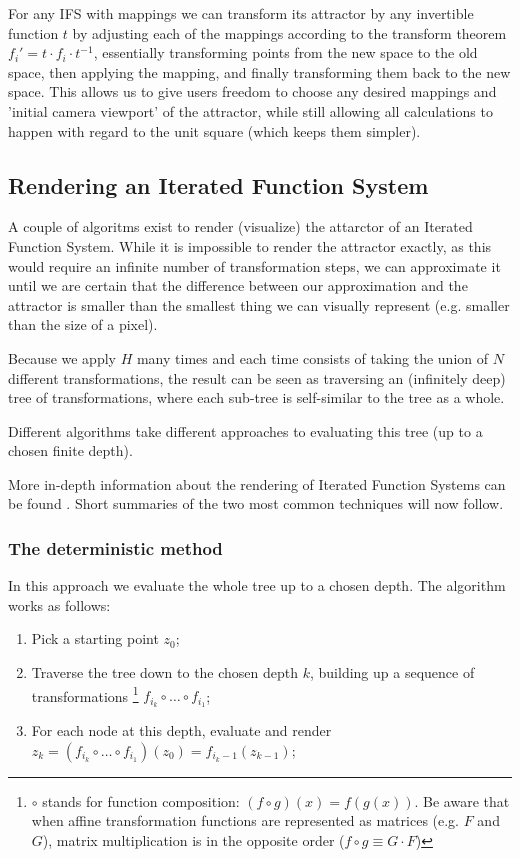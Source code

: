 \documentclass[11pt]{article}
\begin{document}
For any IFS with mappings we can transform its attractor by any invertible function \(t\) by adjusting each of the mappings according to the
transform theorem \cite{barnsley2014fractals} \(f_i' = t \cdot f_i \cdot t^{-1}\), essentially transforming points from the new space to the old space, then applying the mapping, and finally transforming them back to the new space. 
This allows us to give users freedom to choose any desired mappings and 'initial camera viewport' of the attractor,
while still allowing all calculations to happen with regard to the unit square (which keeps them simpler).

\subsection{Rendering an Iterated Function System}
\label{sec:org9da4c3f}

A couple of algoritms exist to render (visualize) the attarctor of an Iterated Function System. 
While it is impossible to render the attractor exactly, as this would require an infinite number of transformation steps,
we can approximate it until we are certain that the difference between our approximation and the attractor is smaller than
the smallest thing we can visually represent (e.g. smaller than the size of a pixel).

Because we apply \(H\) many times and each time consists of taking the union of \(N\) different transformations,
the result can be seen as traversing an (infinitely deep) tree of transformations, 
where each sub-tree is self-similar to the tree as a whole.

Different algorithms take different approaches to evaluating this tree (up to a chosen finite depth).

More in-depth information about the rendering of Iterated Function Systems can be found \cite{hepting1991rendering}. 
Short summaries of the two most common techniques will now follow.

\subsubsection{The deterministic method}
\label{sec:org217e165}

In this approach we evaluate the whole tree up to a chosen depth. The algorithm works as follows:

\begin{enumerate}
\item Pick a starting point \(z_0\);
\item Traverse the tree down to the chosen depth \(k\), building up a sequence of transformations \footnote{\(\circ\) stands for function composition: \((f \circ g)(x) = f(g(x))\). 
Be aware that when affine transformation functions are represented as matrices (e.g. \(F\) and \(G\)), matrix multiplication is in the opposite order (\(f \circ g \equiv G \cdot F\))}
\(f_{i_k} \circ \ldots \circ f_{i_1}\);
\item For each node at this depth, evaluate and render \(z_k = (f_{i_k} \circ \ldots \circ f_{i_1})(z_0) = f_{i_k-1}(z_{k-1})\);
\end{enumerate}
\end{document}
